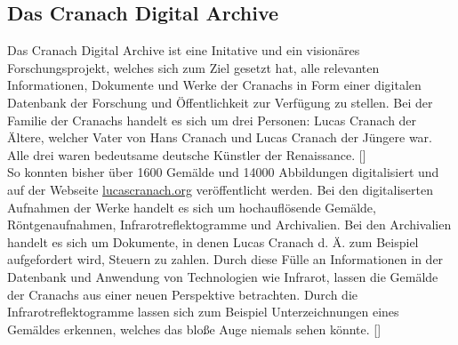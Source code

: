 \documentclass[a4paper,12pt,oneside]{article}
\begin{document}
    \subsection{Das Cranach Digital Archive}
      Das Cranach Digital Archive ist eine Initative und ein visionäres Forschungsprojekt, 
      welches sich zum Ziel gesetzt hat, alle relevanten Informationen, Dokumente und 
      Werke der Cranachs in Form einer digitalen Datenbank der Forschung und Öffentlichkeit zur 
      Verfügung zu stellen. Bei der Familie der Cranachs handelt es sich um drei Personen:
      Lucas Cranach der Ältere, welcher Vater von Hans Cranach und Lucas Cranach der Jüngere
      war. Alle drei waren bedeutsame deutsche Künstler der Renaissance. [\cite{heydenreich2017lucas}] \\
      So konnten bisher über 1600 Gemälde und 14000 Abbildungen digitalisiert und auf der 
      Webseite \url{lucascranach.org} veröffentlicht werden.
      Bei den digitaliserten Aufnahmen der Werke handelt es sich um hochauflösende
      Gemälde, Röntgenaufnahmen, Infrarotreflektogramme und
      Archivalien. Bei den Archivalien handelt es sich um Dokumente, in denen Lucas Cranach
      d. Ä. zum Beispiel aufgefordert wird, Steuern zu zahlen. 
      Durch diese Fülle an Informationen in der Datenbank und Anwendung von Technologien
      wie Infrarot, lassen die Gemälde der Cranachs aus einer neuen Perspektive betrachten.
      Durch die
      Infrarotreflektogramme lassen sich zum Beispiel Unterzeichnungen
      eines Gemäldes erkennen, welches das bloße Auge niemals sehen könnte. [\cite{heydenreich2017lucas}]
\end{document}
